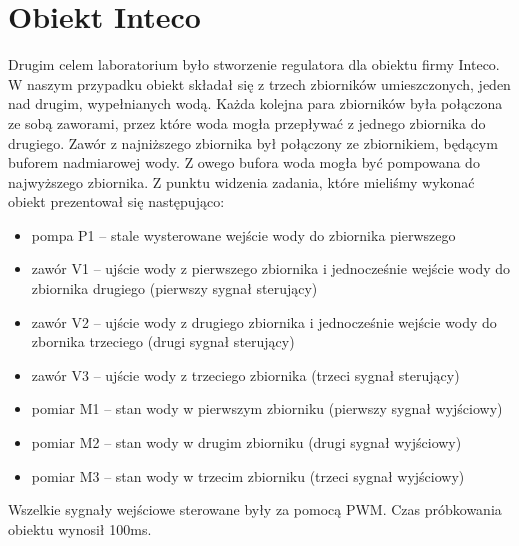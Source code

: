 \section{Obiekt Inteco}
Drugim celem laboratorium było stworzenie regulatora dla obiektu firmy Inteco.
W naszym przypadku obiekt składał się z trzech zbiorników umieszczonych,
jeden nad drugim, wypełnianych wodą. Każda kolejna para zbiorników była
połączona ze sobą zaworami, przez które woda mogła przepływać z jednego
zbiornika do drugiego. Zawór z najniższego zbiornika był połączony ze zbiornikiem,
będącym buforem nadmiarowej wody. Z owego bufora woda mogła być pompowana do
najwyższego zbiornika. Z punktu widzenia zadania, które mieliśmy wykonać
obiekt prezentował się następująco:
\begin{itemize}
  \item pompa P1 -- stale wysterowane wejście wody do zbiornika pierwszego
  \item zawór V1 -- ujście wody z pierwszego zbiornika i
  jednocześnie wejście wody do zbiornika drugiego (pierwszy sygnał sterujący)
  \item zawór V2 -- ujście wody z drugiego zbiornika i jednocześnie wejście
  wody do zbornika trzeciego (drugi sygnał sterujący)
  \item zawór V3 -- ujście wody z trzeciego zbiornika (trzeci sygnał sterujący)
  \item pomiar M1 -- stan wody w pierwszym zbiorniku (pierwszy sygnał wyjściowy)
  \item pomiar M2 -- stan wody w drugim zbiorniku (drugi sygnał wyjściowy)
  \item pomiar M3 -- stan wody w trzecim zbiorniku (trzeci sygnał wyjściowy)
\end{itemize}
Wszelkie sygnały wejściowe sterowane były za pomocą PWM. Czas próbkowania obiektu
wynosił 100ms.
